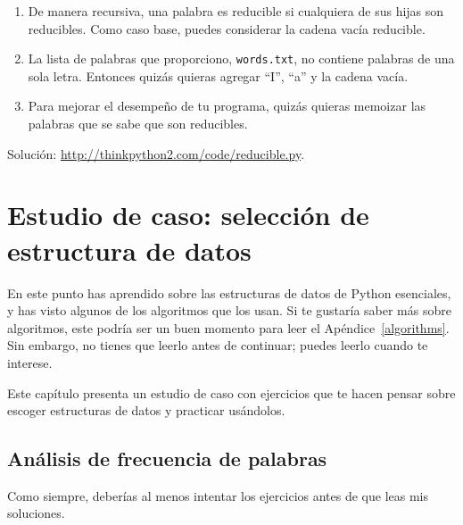 \documentclass[10pt]{book}
\begin{document}
\begin{exercise}
\begin{enumerate}
\item De manera recursiva, una palabra es reducible si cualquiera de sus hijas
son reducibles.  Como caso base, puedes considerar la cadena vacía
reducible.

\item La lista de palabras que proporciono, {\tt words.txt}, no
contiene palabras de una sola letra.  Entonces quizás quieras agregar
``I'', ``a'' y la cadena vacía.

\item Para mejorar el desempeño de tu programa, quizás quieras
memoizar las palabras que se sabe que son reducibles.

\end{enumerate}

Solución: \url{http://thinkpython2.com/code/reducible.py}.

\end{exercise}








\chapter{Estudio de caso: selección de estructura de datos}

En este punto has aprendido sobre las estructuras de datos de Python esenciales,
y has visto algunos de los algoritmos que los usan.
Si te gustaría saber más sobre algoritmos, este podría ser un buen
momento para leer el Apéndice~\ref{algorithms}.
Sin embargo, no tienes que leerlo antes de continuar; puedes leerlo
cuando te interese.

Este capítulo presenta un estudio de caso con ejercicios que te hacen
pensar sobre escoger estructuras de datos y practicar usándolos.


\section{Análisis de frecuencia de palabras}
\label{analysis}

Como siempre, deberías al menos intentar los ejercicios
antes de que leas mis soluciones.
\end{document}
